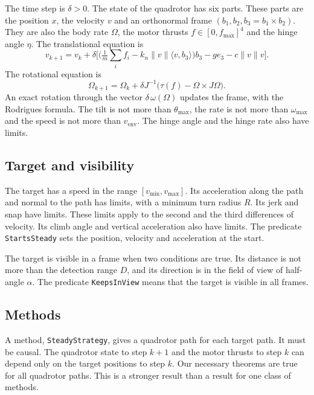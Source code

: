 \documentclass[11pt]{article}
\theoremstyle{definition}
\newcommand{\ip}[2]{\langle #1,#2\rangle}
\newcommand{\norm}[1]{\lVert #1\rVert}
\newcommand{\lean}[1]{\texttt{\small #1}}
\begin{document}
The time step is $\delta > 0$.
The state of the quadrotor has six parts.
These parts are the position $x$, the velocity $v$ and an orthonormal frame $(b_1, b_2, b_3 = b_1 \times b_2)$.
They are also the body rate $\Omega$, the motor thrusts $f \in [0, f_{\max}]^4$ and the hinge angle $\eta$.
The translational equation is
\begin{equation}
  v_{k+1} = v_k + \delta\Big[\Big(\tfrac{1}{m}\textstyle\sum_i f_i - k_n\norm{v}\ip{v}{b_3}\Big) b_3
  - g e_3 - c\norm{v} v\Big].
\end{equation}
The rotational equation is
\begin{equation}
  \Omega_{k+1} = \Omega_k + \delta J^{-1}\big(\tau(f) - \Omega\times J\Omega\big).
\end{equation}
An exact rotation through the vector $\delta\,\omega(\Omega)$ updates the frame, with the
Rodrigues formula.
The tilt is not more than $\theta_{\max}$, the rate is not more than $\omega_{\max}$ and the speed
is not more than $v_{\mathrm{env}}$.
The hinge angle and the hinge rate also have limits.

\subsection{Target and visibility}

The target has a speed in the range $[v_{\min}, v_{\max}]$.
Its acceleration along the path and normal to the path has limits, with a minimum turn radius $R$.
Its jerk and snap have limits.
These limits apply to the second and the third differences of velocity.
Its climb angle and vertical acceleration also have limits.
The predicate \lean{StartsSteady} sets the position, velocity and acceleration at the start.

The target is visible in a frame when two conditions are true.
Its distance is not more than the detection range $D$, and its direction is in the field of view
of half-angle $\alpha$.
The predicate \lean{KeepsInView} means that the target is visible in all frames.

\subsection{Methods}

A method, \lean{SteadyStrategy}, gives a quadrotor path for each target path.
It must be causal.
The quadrotor state to step $k+1$ and the motor thrusts to step $k$ can depend only on the target
positions to step $k$.
Our necessary theorems are true for all quadrotor paths.
This is a stronger result than a result for one class of methods.
\end{document}
